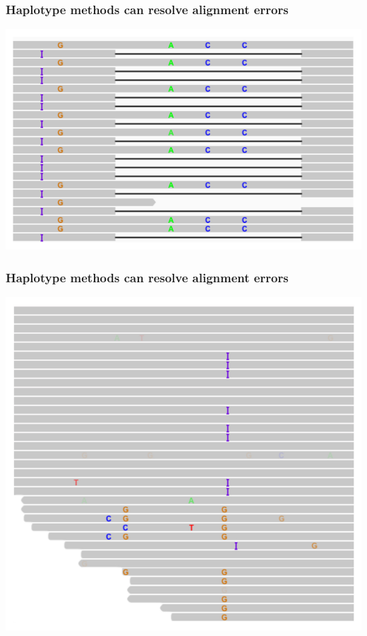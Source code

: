 \documentclass{beamer}
\begin{document}
\begin{frame}
\frametitle{Haplotype methods can resolve alignment errors}

\begin{center}
    
    \includegraphics[height=0.7\textheight]{images/haplotype_callers1}
    
\end{center}

\end{frame}

\begin{frame}
\frametitle{Haplotype methods can resolve alignment errors}

\begin{center}
    
    \includegraphics[height=0.8\textheight]{images/haplotype_callers2}
    
\end{center}

\end{frame}
\end{document}
